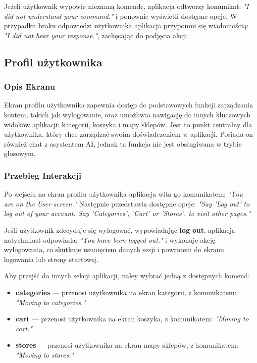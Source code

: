 Jeżeli użytkownik wypowie nieznaną komendę, aplikacja odtworzy komunikat: \textit{"I did not understand your command."} i ponownie wyświetli dostępne opcje. W przypadku braku odpowiedzi użytkownika aplikacja przypomni się wiadomością: \textit{"I did not hear your response."}, zachęcając do podjęcia akcji.

\subsection{Profil użytkownika}

\subsubsection{Opis Ekranu}
Ekran profilu użytkownika zapewnia dostęp do podstawowych funkcji zarządzania kontem, takich jak wylogowanie, oraz umożliwia nawigację do innych kluczowych widoków aplikacji: kategorii, koszyka i mapy sklepów. Jest to punkt centralny dla użytkownika, który chce zarządzać swoim doświadczeniem w aplikacji. Posiada on również chat z asystentem AI, jednak ta funkcja nie jest obsługiwana w trybie głosowym.

\subsubsection{Przebieg Interakcji}
Po wejściu na ekran profilu użytkownika aplikacja wita go komunikatem: \textit{"You are on the User screen."} Następnie przedstawia dostępne opcje: \textit{"Say 'Log out' to log out of your account. Say 'Categories', 'Cart' or 'Stores', to visit other pages."}

Jeśli użytkownik zdecyduje się wylogować, wypowiadając \textbf{log out}, aplikacja natychmiast odpowiada: \textit{"You have been logged out."} i wykonuje akcję wylogowania, co skutkuje usunięciem danych sesji i powrotem do ekranu logowania lub strony startowej.

Aby przejść do innych sekcji aplikacji, naley wybrać jedną z dostępnych komend:
\begin{itemize}
    \item \textbf{categories} — przenosi użytkownika na ekran kategorii, z komunikatem: \textit{"Moving to categories."}
    \item \textbf{cart} — przenosi użytkownika na ekran koszyka, z komunikatem: \textit{"Moving to cart."}
    \item \textbf{stores} — przenosi użytkownika na ekran mapy sklepów, z komunikatem: \textit{"Moving to stores."}
\end{itemize}

